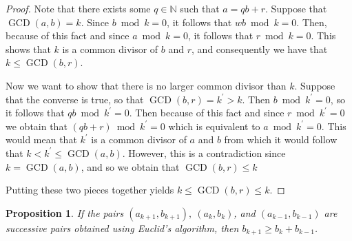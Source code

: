 \documentclass{article}
\newtheorem{proposition}{Proposition}
\DeclareMathOperator{\GCD}{GCD}
\begin{document}
\begin{proof}
  Note that there exists some $q \in \mathbb{N}$ such that $a = qb + r$.
  Suppose that $\GCD(a, b) = k$.  Since $b \bmod k = 0$, it follows that
  $wb \bmod k = 0$.  Then, because of this fact and since $a \bmod k = 0$, it
  follows that $r \bmod k = 0$.  This shows that $k$ is a common divisor of $b$
  and $r$, and consequently we have that $k \leq \GCD(b, r)$.

  Now we want to show that there is no larger common divisor than $k$.  Suppose
  that the converse is true, so that $\GCD(b, r) = k^{\prime} > k$.  Then
  $b \bmod k^{\prime} = 0$, so it follows that $qb \bmod k^{\prime} = 0$.  Then
  because of this fact and since $r \bmod k^{\prime} = 0$ we obtain that
  $(qb + r) \bmod k^{\prime} = 0$ which is equivalent to
  $a \bmod k^{\prime} = 0$.  This would mean that $k^{\prime}$ is a common
  divisor of $a$ and $b$ from which it would follow that
  $k < k^{\prime} \leq \GCD(a, b)$.  However, this is a contradiction since
  $k = \GCD(a, b)$, and so we obtain that $\GCD(b, r) \leq k$

  Putting these two pieces together yields $k \leq \GCD(b, r) \leq k$.
\end{proof}
\vspace{5mm}




\begin{proposition}
  \label{thm:bound-for-euclid-bs}
  If the pairs $(a_{k + 1}, b_{k + 1}),~ (a_k, b_k)$, and
  $(a_{k - 1}, b_{k - 1})$ are successive pairs obtained using Euclid's
  algorithm, then $b_{k + 1} \geq b_k + b_{k - 1}$.
\end{proposition}
\end{document}
